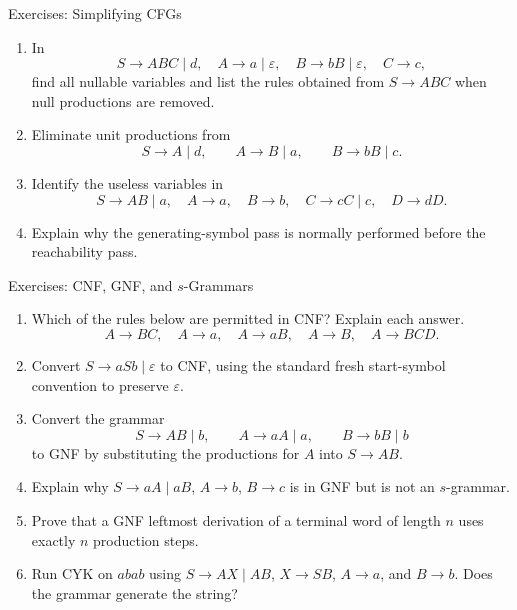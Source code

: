 \documentclass[10pt]{beamer}
\begin{document}
\begin{frame}{Exercises: Simplifying CFGs}
  \small
  \begin{enumerate}
    \item In
      \[
        S\to ABC\mid d,\quad A\to a\mid\varepsilon,\quad
        B\to bB\mid\varepsilon,\quad C\to c,
      \]
      find all nullable variables and list the rules obtained from
      $S\to ABC$ when null productions are removed.
    \item Eliminate unit productions from
      \[
        S\to A\mid d,\qquad A\to B\mid a,\qquad B\to bB\mid c.
      \]
    \item Identify the useless variables in
      \[
        S\to AB\mid a,\quad A\to a,\quad B\to b,\quad
        C\to cC\mid c,\quad D\to dD.
      \]
    \item Explain why the generating-symbol pass is normally performed before
      the reachability pass.
  \end{enumerate}
\end{frame}

\begin{frame}{Exercises: CNF, GNF, and $s$-Grammars}
  \small
  \begin{enumerate}
    \item Which of the rules below are permitted in CNF? Explain each answer.
      \[
        A\to BC,\quad A\to a,\quad A\to aB,\quad A\to B,
        \quad A\to BCD.
      \]
    \item Convert $S\to aSb\mid\varepsilon$ to CNF, using the standard fresh
      start-symbol convention to preserve $\varepsilon$.
    \item Convert the grammar
      \[
        S\to AB\mid b,\qquad A\to aA\mid a,\qquad B\to bB\mid b
      \]
      to GNF by substituting the productions for $A$ into $S\to AB$.
    \item Explain why $S\to aA\mid aB$, $A\to b$, $B\to c$ is in GNF but is
      not an $s$-grammar.
    \item Prove that a GNF leftmost derivation of a terminal word of length
      $n$ uses exactly $n$ production steps.
    \item Run CYK on $abab$ using
      $S\to AX\mid AB$, $X\to SB$, $A\to a$, and $B\to b$.
      Does the grammar generate the string?
  \end{enumerate}
\end{frame}
\end{document}
